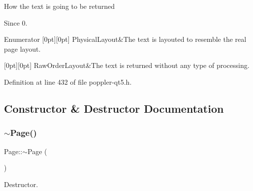 How the text is going to be returned \begin{DoxySince}{Since}
0. 
\end{DoxySince}
\begin{DoxyEnumFields}{Enumerator}
[0pt][0pt]{}\mbox{\label{class_poppler_1_1_page_ac2fe47d36367d63d78f493bec5ea0450a88a6ed05c8cf9566e5fc08068c0301b8}} 
Physical\+Layout&The text is layouted to resemble the real page layout. \\
\hline

[0pt][0pt]{}\mbox{\label{class_poppler_1_1_page_ac2fe47d36367d63d78f493bec5ea0450a367163078500f3158bdeeb26166dd46d}} 
Raw\+Order\+Layout&The text is returned without any type of processing. \\
\hline

\end{DoxyEnumFields}


Definition at line 432 of file poppler-\/qt5.\+h.



\subsection{Constructor \& Destructor Documentation}
\mbox{\label{class_poppler_1_1_page_a2341fff1cc032ab6528874175e7dd841}} 
\subsubsection{\texorpdfstring{$\sim$\+Page()}{~Page()}}
{\footnotesize\ttfamily Page\+::$\sim$\+Page (\begin{DoxyParamCaption}{ }\end{DoxyParamCaption})}

Destructor. 

